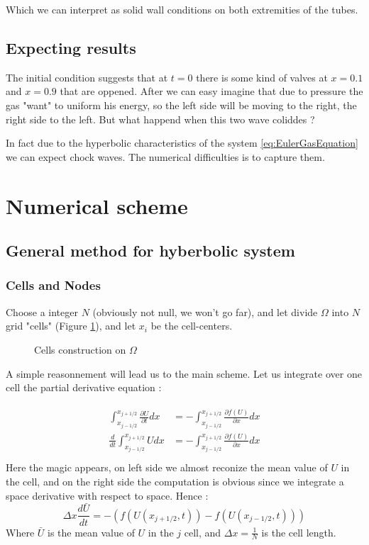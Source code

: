 \documentclass[a4paper,12pt]{article}
\begin{document}
Which we can interpret as solid wall conditions on both extremities of the tubes. 

\subsection{Expecting results}
The initial condition suggests that at $t=0$ there is some kind of valves at $x= 0.1$ and $x=0.9$ that are oppened. After we can easy imagine that due to pressure the gas "want" to uniform his energy, so the left side will be moving to the right, the right side to the left. 
But what happend when this two wave coliddes ?

In fact due to the hyperbolic characteristics of the system \ref{eq:EulerGasEquation} we can expect chock waves. The numerical difficulties is to capture them. 

\section{Numerical scheme}
\subsection{General method for hyberbolic system}
\subsubsection{Cells and Nodes}
Choose a integer $N$ (obviously not null, we won't go far), and let divide $\Omega$ into $N$ grid "cells" (Figure \ref{fig:OmegaCells}), and let $x_i$ be the cell-centers. 
\begin{figure}[!h]
\centering

\caption{\label{fig:OmegaCells} Cells construction on $\Omega$ }
\end{figure}
A simple reasonnement will lead us to the main scheme. Let us integrate over one cell the partial derivative equation : 

\begin{align*}
\begin{split}
\int_{x_{j-1/2}}^{x_{j+1/2}} \frac{\partial U}{\partial t} dx &= - \int_{x_{j-1/2}}^{x_{j+1/2}} \frac{\partial f(U)}{\partial x} dx\\
\frac{d}{dt}\int_{x_{j-1/2}}^{x_{j+1/2}} U dx &= -\int_{x_{j-1/2}}^{x_{j+1/2}} \frac{\partial f(U)}{\partial x} dx\\
\end{split}
\end{align*}
Here the magic appears, on left side we almost reconize the mean value of $U$ in the cell, and on the right side the computation is obvious since we integrate a space derivative with respect to space. Hence : 
$$
\Delta x \frac{d\bar{U}}{dt} = -(f(U(x_{j+1/2},t)) - f(U(x_{j-1/2},t)))
$$
Where $\bar{U}$ is the mean value of $U$ in the $j$ cell, and $\Delta x =\frac{1}{N}$ is the cell length. \\
\end{document}
